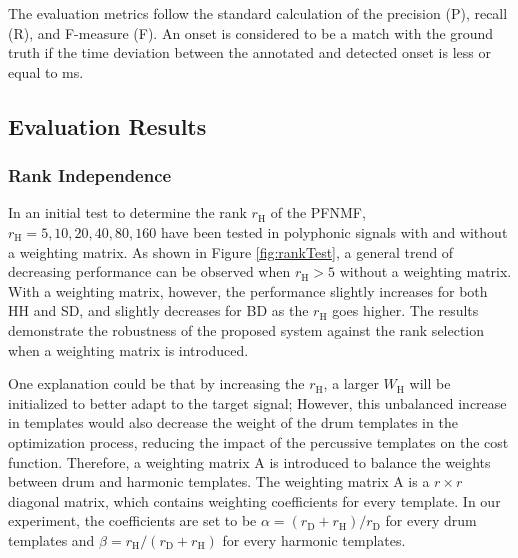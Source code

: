 \documentclass{article}
\begin{document}
The evaluation metrics follow the standard calculation of the precision (P), recall (R), and F-measure (F). An onset is considered to be a match with the ground truth if the time deviation between the annotated and detected onset is less or equal to \unit[50]{ms}.  

\subsection{Evaluation Results}\label{subsec:evaluation results}

\subsubsection{Rank Independence}\label{rank}
In an initial test to determine the rank $r_\mathrm{H}$ of the PFNMF, $r_\mathrm{H} = {5, 10, 20, 40, 80, 160}$ have been tested in polyphonic signals with and without a weighting matrix. As shown in Figure \ref{fig:rankTest}, a general trend of decreasing performance can be observed when $r_\mathrm{H} > 5$ without a weighting matrix. With a weighting matrix, however, the performance slightly increases for both HH and SD, and slightly decreases for BD as the $r_\mathrm{H}$ goes higher. The results demonstrate the robustness of the proposed system against the rank selection when a weighting matrix is introduced.

One explanation could be that by increasing the $r_\mathrm{H}$, a larger $W_\mathrm{H}$ will be initialized to better adapt to the target signal; However, this unbalanced increase in templates would also decrease the weight of the drum templates in the optimization process, reducing the impact of the percussive templates on the cost function. Therefore, a weighting matrix $\mathrm{A}$ is introduced to balance the weights between drum and harmonic templates. The weighting matrix $\mathrm{A}$ is a $r \times r$ diagonal matrix, which contains weighting coefficients for every template. In our experiment, the coefficients are set to be $\alpha = (r_\mathrm{D} + r_\mathrm{H})/ r_\mathrm{D}$ for every drum templates and $\beta = r_\mathrm{H}/ (r_\mathrm{D} + r_\mathrm{H})$ for every harmonic templates.
\end{document}
